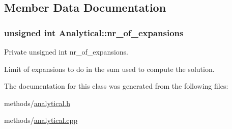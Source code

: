 \subsection{Member Data Documentation}
\subsubsection[{\texorpdfstring{nr\+\_\+of\+\_\+expansions}{nr_of_expansions}}]{\setlength{\rightskip}{0pt plus 5cm}unsigned int Analytical\+::nr\+\_\+of\+\_\+expansions\hspace{0.3cm}{\ttfamily [private]}}\hypertarget{classAnalytical_a853d708e2c746c3b81df14770594b76a}{}\label{classAnalytical_a853d708e2c746c3b81df14770594b76a}


Private unsigned int nr\+\_\+of\+\_\+expansions. 

Limit of expansions to do in the sum used to compute the solution. 

The documentation for this class was generated from the following files\+:\begin{DoxyCompactItemize}
\item 
methods/\hyperlink{analytical_8h}{analytical.\+h}\item 
methods/\hyperlink{analytical_8cpp}{analytical.\+cpp}\end{DoxyCompactItemize}
